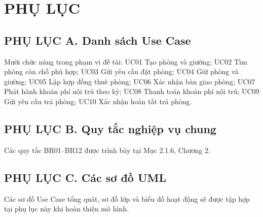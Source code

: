 \clearpage
\chapter*{PHỤ LỤC}
{}

\section*{PHỤ LỤC A. Danh sách Use Case}
{}

Mười chức năng trong phạm vi đề tài: UC01 Tạo phòng và giường; UC02 Tìm phòng còn chỗ phù hợp; UC03 Gửi yêu cầu đặt phòng; UC04 Giữ phòng và giường; UC05 Lập hợp đồng thuê phòng; UC06 Xác nhận bàn giao phòng; UC07 Phát hành khoản phí nội trú theo kỳ; UC08 Thanh toán khoản phí nội trú; UC09 Gửi yêu cầu trả phòng; UC10 Xác nhận hoàn tất trả phòng.

\section*{PHỤ LỤC B. Quy tắc nghiệp vụ chung}
{}

Các quy tắc BR01--BR12 được trình bày tại Mục 2.1.6, Chương 2.

\section*{PHỤ LỤC C. Các sơ đồ UML}
{}

Các sơ đồ Use Case tổng quát, sơ đồ lớp và biểu đồ hoạt động sẽ được tập hợp tại phụ lục này khi hoàn thiện mô hình.
